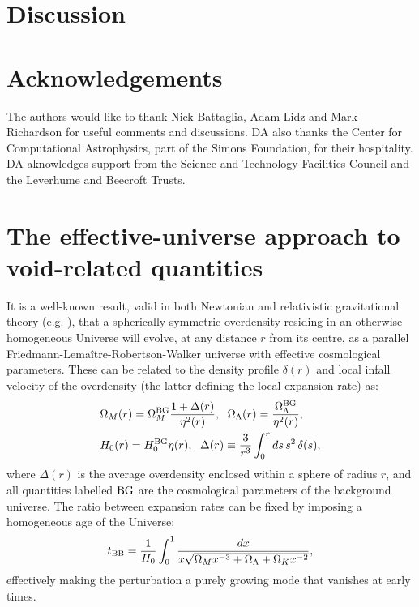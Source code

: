 \documentclass[twocolumn,amsfont,amssymb,amsmath, showpacs,balancelastpage, nofootinbib]{revtex4-1}
\newcommand{\DAM}[1]{{\color{red}{\bf DA: #1}}}
\begin{document}
  \section{Discussion}\label{sec:discussion}
    \lipsum[4]

\section*{Acknowledgements}
  The authors would like to thank Nick Battaglia, Adam Lidz and Mark Richardson for useful
  comments and discussions. DA also thanks the Center for Computational Astrophysics, part
  of the Simons Foundation, for their hospitality. DA aknowledges support from the Science
  and Technology Facilities Council and the Leverhume and Beecroft Trusts. \DAM{more?}



\appendix
\section{The effective-universe approach to void-related quantities}\label{app:effu}
  It is a well-known result, valid in both Newtonian and relativistic gravitational theory
  (e.g. \cite{1947MNRAS.107..410B}), that a spherically-symmetric overdensity residing
  in an otherwise homogeneous Universe will evolve, at any distance $r$ from its centre, as
  a parallel Friedmann-Lema\^itre-Robertson-Walker universe with effective cosmological
  parameters. These can be related to the density profile $\delta(r)$ and local infall
  velocity of the overdensity (the latter defining the local expansion rate) as:
  \begin{align}
    &\Omega_M(r)=\Omega_M^{\rm BG}\frac{1+\Delta(r)}{\eta^2(r)},\hspace{6pt}
    \Omega_\Lambda(r)=\frac{\Omega_\Lambda^{\rm BG}}{\eta^2(r)},\\
    &H_0(r)=H_0^{\rm BG}\eta(r),
    \hspace{6pt}\Delta(r)\equiv\frac{3}{r^3}\int_0^rds\,s^2\,\delta(s),
  \end{align}
  where $\Delta(r)$ is the average overdensity enclosed within a sphere of radius $r$,
  and all quantities labelled ${\rm BG}$ are the cosmological parameters of the background
  universe. The ratio between expansion rates can be fixed by imposing a homogeneous age
  of the Universe:
  \begin{equation}
    t_{\rm BB}=\frac{1}{H_0}\int_0^1
    \frac{dx}{x\sqrt{\Omega_Mx^{-3}+\Omega_\Lambda+\Omega_Kx^{-2}}},
  \end{equation}
  effectively making the perturbation a purely growing mode that vanishes at early times.
  
\end{document}
